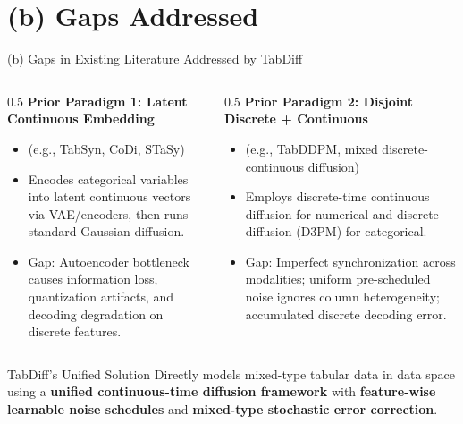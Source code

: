 \documentclass[aspectratio=169, 10pt]{beamer}
\begin{document}
\section{(b) Gaps Addressed}

\begin{frame}{(b) Gaps in Existing Literature Addressed by TabDiff}
  \begin{columns}
    \begin{column}{0.5\textwidth}
      \textbf{Prior Paradigm 1: Latent Continuous Embedding}
      \begin{itemize}
        \item (e.g., TabSyn, CoDi, STaSy)
        \item Encodes categorical variables into latent continuous vectors via VAE/encoders, then runs standard Gaussian diffusion.
        \item \alert{Gap:} Autoencoder bottleneck causes information loss, quantization artifacts, and decoding degradation on discrete features.
      \end{itemize}
    \end{column}
    \begin{column}{0.5\textwidth}
      \textbf{Prior Paradigm 2: Disjoint Discrete + Continuous}
      \begin{itemize}
        \item (e.g., TabDDPM, mixed discrete-continuous diffusion)
        \item Employs discrete-time continuous diffusion for numerical and discrete diffusion (D3PM) for categorical.
        \item \alert{Gap:} Imperfect synchronization across modalities; uniform pre-scheduled noise ignores column heterogeneity; accumulated discrete decoding error.
      \end{itemize}
    \end{column}
  \end{columns}
  \vspace{0.4cm}
  \begin{block}{TabDiff's Unified Solution}
    Directly models mixed-type tabular data in data space using a \textbf{unified continuous-time diffusion framework} with \textbf{feature-wise learnable noise schedules} and \textbf{mixed-type stochastic error correction}.
  \end{block}
\end{frame}
\end{document}
